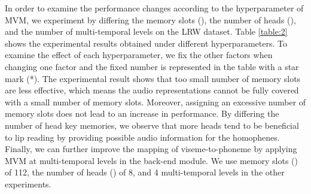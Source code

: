 \documentclass[letterpaper]{article} \usepackage{aaai22}  \usepackage{times}  \usepackage{helvet}  \usepackage{courier}  \usepackage[hyphens]{url}  \usepackage{graphicx} \urlstyle{rm} \def\UrlFont{\rm}  \usepackage{natbib}  \usepackage{caption} \DeclareCaptionStyle{ruled}{labelfont=normalfont,labelsep=colon,strut=off} \frenchspacing  \setlength{\pdfpagewidth}{8.5in}  \setlength{\pdfpageheight}{11in}  \usepackage{algorithm}
\begin{document}
\begin{table}[t!]
\renewcommand{\arraystretch}{1.4}
\caption{Word accuracy comparison on LRW. 
}
\label{table:3}
\end{table}

In order to examine the performance changes according to the hyperparameter of MVM, we experiment by differing the memory slots (), the number of heads (), and the number of multi-temporal levels on the LRW dataset. Table \ref{table:2} shows the experimental results obtained under different hyperparameters. To examine the effect of each hyperparameter, we fix the other factors when changing one factor and the fixed number is represented in the table with a star mark (*). The experimental result shows that too small number of memory slots are less effective, which means the audio representations cannot be fully covered with a small number of memory slots. Moreover, assigning an excessive number of memory slots does not lead to an increase in performance. By differing the number of head key memories, we observe that more heads tend to be beneficial to lip reading by providing possible audio information for the homophenes. Finally, we can further improve the mapping of viseme-to-phoneme by applying MVM at multi-temporal levels in the back-end module. We use memory slots () of 112, the number of heads () of 8, and 4 multi-temporal levels in the other experiments.
\end{document}
